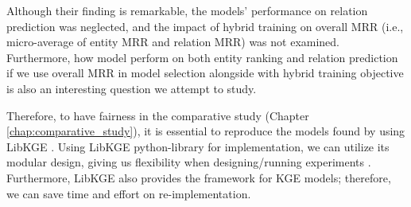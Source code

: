 \begin{table}[!htbp]
\centering
{}
\caption[The performance of ComplEx models on test data.]{The performance of ComplEx models in Entity Ranking on Test data. The results are taken from \citep{chen2021relation}'s paper.}
\label{tab:AKBC results}
\end{table}



Although their finding is remarkable, the models' performance on relation prediction was neglected, and the impact of hybrid training on overall MRR (i.e., micro-average of entity MRR and relation MRR) was not examined. Furthermore, how model perform on both entity ranking and relation prediction if we use overall MRR in model selection alongside with hybrid training objective is also an interesting question we attempt to study. 

Therefore, to have fairness in the comparative study (Chapter \ref{chap:comparative_study}), it is essential to reproduce the models found by \citet{chen2021relation} using LibKGE \citep{libkge}. Using LibKGE python-library \citep{libkge} for implementation, we can utilize its modular design, giving us flexibility when designing/running experiments \citep{Ruffinelli2020You}. Furthermore, LibKGE also provides the framework for KGE models; therefore, we can save time and effort on re-implementation.

